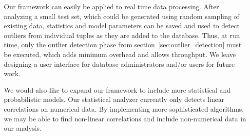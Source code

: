 
Our framework can easily be applied to real time data processing.
After analyzing a small test set, which could be generated using random sampling of existing data, statistics and model parameters can be saved and used to detect outliers from individual tuples as they are added to the database.
Thus, at run time, only the outlier detection phase from section~\ref{sec:outlier_detection} must be executed, which adds minimum overhead and allows throughput.
We leave designing a user interface for database administrators and/or users for future work.

We would also like to expand our framework to include more statistical and probabilistic models. Our statistical analyzer currently only detects linear correlations on numerical data.
By implementing more sophisticated algorithms, we may be able to find non-linear correlations and include non-numerical data in our analysis.